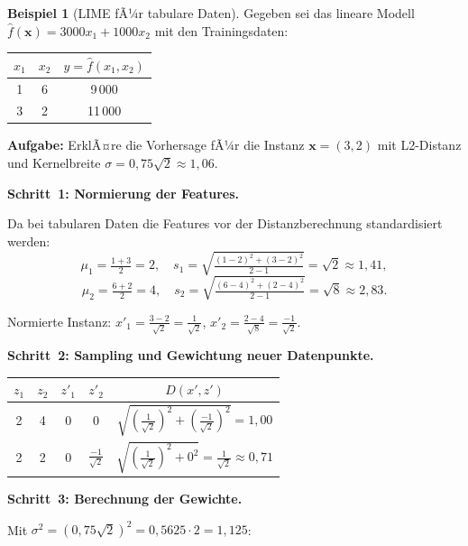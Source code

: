 ﻿\documentclass[a4paper,12pt]{article}
\theoremstyle{definition}
\newtheorem{beispiel}{Beispiel}[section]
\begin{document}
\begin{beispiel}[LIME fÃ¼r tabulare Daten]
  \label{bsp:lime_tabular}
  Gegeben sei das lineare Modell $\hat{f}(\mathbf{x}) = 3000 x_1 + 1000 x_2$ mit den
  Trainingsdaten:
  \begin{center}
  \begin{tabular}{@{}ccc@{}}
    \toprule
    $x_1$ & $x_2$ & $y = \hat{f}(x_1, x_2)$ \\
    \midrule
    1 & 6 & 9\,000 \\
    3 & 2 & 11\,000 \\
    \bottomrule
  \end{tabular}
  \end{center}

  \textbf{Aufgabe:} ErklÃ¤re die Vorhersage fÃ¼r die Instanz $\mathbf{x} = (3, 2)$ mit
  L2-Distanz und Kernelbreite $\sigma = 0{,}75\sqrt{2} \approx 1{,}06$.

  \textbf{Schritt~1: Normierung der Features.}

  Da bei tabularen Daten die Features vor der Distanzberechnung standardisiert werden:
  \[
    \mu_1 = \tfrac{1+3}{2} = 2, \quad
    s_1 = \sqrt{\tfrac{(1-2)^2+(3-2)^2}{2-1}} = \sqrt{2} \approx 1{,}41,
  \]
  \[
    \mu_2 = \tfrac{6+2}{2} = 4, \quad
    s_2 = \sqrt{\tfrac{(6-4)^2+(2-4)^2}{2-1}} = \sqrt{8} \approx 2{,}83.
  \]

  Normierte Instanz:
  $x'_1 = \frac{3-2}{\sqrt{2}} = \frac{1}{\sqrt{2}}$, \quad
  $x'_2 = \frac{2-4}{\sqrt{8}} = \frac{-1}{\sqrt{2}}$.

  \textbf{Schritt~2: Sampling und Gewichtung neuer Datenpunkte.}

  \begin{center}
  \begin{tabular}{@{}ccccc@{}}
    \toprule
    $z_1$ & $z_2$ & $z'_1$ & $z'_2$ & $D(x', z')$ \\
    \midrule
    2 & 4 & $0$ & $0$ &
    $\sqrt{\left(\tfrac{1}{\sqrt{2}}\right)^2 + \left(\tfrac{-1}{\sqrt{2}}\right)^2}
     = 1{,}00$ \\[4pt]
    2 & 2 & $0$ & $\tfrac{-1}{\sqrt{2}}$ &
    $\sqrt{\left(\tfrac{1}{\sqrt{2}}\right)^2 + 0^2}
     = \tfrac{1}{\sqrt{2}} \approx 0{,}71$ \\
    \bottomrule
  \end{tabular}
  \end{center}

  \textbf{Schritt~3: Berechnung der Gewichte.}

  Mit $\sigma^2 = (0{,}75\sqrt{2})^2 = 0{,}5625 \cdot 2 = 1{,}125$:


\end{beispiel}
\end{document}
